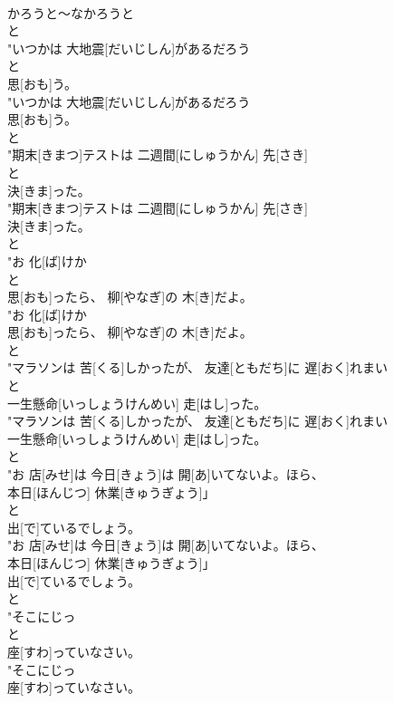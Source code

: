 \documentclass[8pt]{extreport}
\begin{document}
\begin{CJK}{UTF8}{min}
\\	かろうと～なかろうと	
\\	と
\\	"いつかは 大地震[だいじしん]があるだろう
\\	と
\\	思[おも]う。
\\	"いつかは 大地震[だいじしん]があるだろう
\\	思[おも]う。
\\	と
\\	"期末[きまつ]テストは 二週間[にしゅうかん] 先[さき]
\\	と
\\	決[きま]った。
\\	"期末[きまつ]テストは 二週間[にしゅうかん] 先[さき]
\\	決[きま]った。
\\	と
\\	"お 化[ば]けか
\\	と
\\	思[おも]ったら、 柳[やなぎ]の 木[き]だよ。
\\	"お 化[ば]けか
\\	思[おも]ったら、 柳[やなぎ]の 木[き]だよ。
\\	と
\\	"マラソンは 苦[くる]しかったが、 友達[ともだち]に 遅[おく]れまい
\\	と
\\	一生懸命[いっしょうけんめい] 走[はし]った。
\\	"マラソンは 苦[くる]しかったが、 友達[ともだち]に 遅[おく]れまい
\\	一生懸命[いっしょうけんめい] 走[はし]った。
\\	と
\\	"お 店[みせ]は 今日[きょう]は 開[あ]いてないよ。ほら、
\\	本日[ほんじつ] 休業[きゅうぎょう]」
\\	と
\\	出[で]ているでしょう。
\\	"お 店[みせ]は 今日[きょう]は 開[あ]いてないよ。ほら、
\\	本日[ほんじつ] 休業[きゅうぎょう]」
\\	出[で]ているでしょう。
\\	と
\\	"そこにじっ
\\	と
\\	座[すわ]っていなさい。
\\	"そこにじっ
\\	座[すわ]っていなさい。

\end{CJK}
\end{document}
